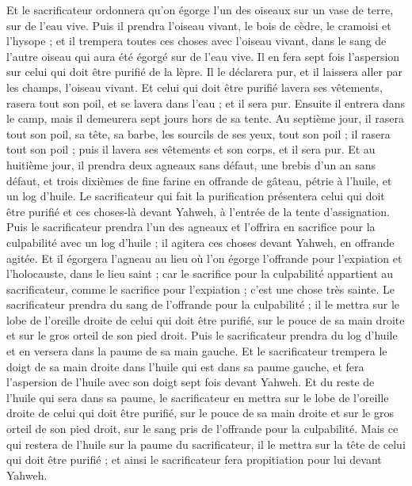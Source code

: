 \begin{multicols}{2}
Et le sacrificateur ordonnera qu'on égorge l'un des oiseaux sur un vase de terre, sur de l'eau vive.
Puis il prendra l'oiseau vivant, le bois de cèdre, le cramoisi et l'hysope ; et il trempera toutes ces choses avec l'oiseau vivant, dans le sang de l'autre oiseau qui aura été égorgé sur de l'eau vive.
Il en fera sept fois l'aspersion sur celui qui doit être purifié de la lèpre. Il le déclarera pur, et il laissera aller par les champs, l'oiseau vivant.
Et celui qui doit être purifié lavera ses vêtements, rasera tout son poil, et se lavera dans l'eau ; et il sera pur. Ensuite il entrera dans le camp, mais il demeurera sept jours hors de sa tente.
Au septième jour, il rasera tout son poil, sa tête, sa barbe, les sourcils de ses yeux, tout son poil ; il rasera tout son poil ; puis il lavera ses vêtements et son corps, et il sera pur.
Et au huitième jour, il prendra deux agneaux sans défaut, une brebis d'un an sans défaut, et trois dixièmes de fine farine en offrande de gâteau, pétrie à l'huile, et un log d'huile.
Le sacrificateur qui fait la purification présentera celui qui doit être purifié et ces choses-là devant Yahweh, à l'entrée de la tente d'assignation.
Puis le sacrificateur prendra l'un des agneaux et l'offrira en sacrifice pour la culpabilité avec un log d'huile ; il agitera ces choses devant Yahweh, en offrande agitée.
Et il égorgera l'agneau au lieu où l'on égorge l'offrande pour l'expiation et l'holocauste, dans le lieu saint ; car le sacrifice pour la culpabilité appartient au sacrificateur, comme le sacrifice pour l'expiation ; c'est une chose très sainte.
Le sacrificateur prendra du sang de l'offrande pour la culpabilité ; il le mettra sur le lobe de l'oreille droite de celui qui doit être purifié, sur le pouce de sa main droite et sur le gros orteil de son pied droit.
Puis le sacrificateur prendra du log d'huile et en versera dans la paume de sa main gauche.
Et le sacrificateur trempera le doigt de sa main droite dans l'huile qui est dans sa paume gauche, et fera l'aspersion de l'huile avec son doigt sept fois devant Yahweh.
Et du reste de l'huile qui sera dans sa paume, le sacrificateur en mettra sur le lobe de l'oreille droite de celui qui doit être purifié, sur le pouce de sa main droite et sur le gros orteil de son pied droit, sur le sang pris de l'offrande pour la culpabilité.
Mais ce qui restera de l'huile sur la paume du sacrificateur, il le mettra sur la tête de celui qui doit être purifié ; et ainsi le sacrificateur fera propitiation pour lui devant Yahweh.

\end{multicols}
